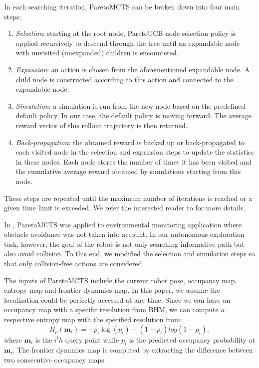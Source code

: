 In each searching iteration, ParetoMCTS can be broken down into four main steps:
\begin{enumerate}
    \item \textit{Selection}: starting at the root node, ParetoUCB node selection policy is applied recursively to descend through the tree until an expandable node with unvisited (unexpanded) children is encountered.
    \item \textit{Expansion}: an action is chosen from the aforementioned expandable node.  A child node is constructed according to this action and connected to the expandable node.
    \item \textit{Simulation}: a simulation is run from the new node based on the predefined default policy. In our case, the default policy is moving forward.
    The average reward vector of this rollout trajectory is then returned.
    \item \textit{Back-propagation}: the obtained reward is backed up or back-propagated to each visited node in the selection and expansion steps to update the statistics in these nodes.
    Each node stores the number of times it has been visited and the cumulative average reward obtained by simulations starting from this node.
\end{enumerate}
These steps are repeated until the maximum number of iterations is reached or a given time limit is exceeded.
We refer the interested reader to \cite{chen2019pareto} for more details.

In \cite{chen2019pareto}, ParetoMCTS was applied to environmental monitoring application where obstacle avoidance was not taken into account.
In our autonomous exploration task, however, the goal of the robot is not only searching informative path but also avoid collision.
To this end, we modified the selection and simulation steps so that only collision-free actions are considered.



The inputs of ParetoMCTS include the current robot pose, occupancy map, entropy map and frontier dynamics map. In this paper, we assume the localization could be perfectly accessed at any time. Since we can have an occupancy map with a specific resolution from BHM, we can compute a respective entropy map with the specified resolution from:
\begin{equation}
    \label{eq:entropy}
    H_p(\mathbf{m}_i) = -p_i\log(p_i) - (1-p_i)log(1-p_i),
\end{equation}
where $\mathbf{m}_i$ is the $i^th$ query point while $p_i$ is the predicted occupancy probability at $\mathbf{m}_i$. The frontier dynamics map is computed by extracting the difference between two consecutive occupancy maps.

